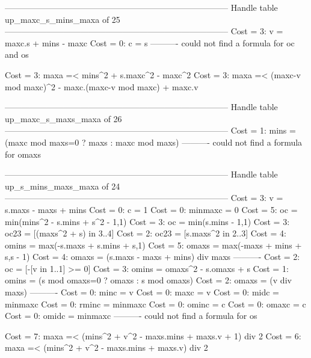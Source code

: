 --------------------------------------------------------------------------------
Handle table up_maxc_s_mins_maxa of 25
--------------------------------------------------------------------------------
Cost =  3:  v  = maxc.s + mins - maxc
Cost =  0:  c  = s
----------
could not find a formula for oc and os

Cost =  3:  maxa =< mins^2 + s.maxc^2 - maxc^2
Cost =  3:  maxa =< (maxc-v mod maxc)^2 - maxc.(maxc-v mod maxc) + maxc.v

--------------------------------------------------------------------------------
Handle table up_maxc_s_maxs_maxa of 26
--------------------------------------------------------------------------------
Cost =  1:  mins  = (maxc mod maxs=0 ? maxs : maxc mod maxs)
----------
could not find a formula for omaxs


--------------------------------------------------------------------------------
Handle table up_s_mins_maxs_maxa of 24
--------------------------------------------------------------------------------
Cost =  3:  v       = s.maxs - maxs + mins
Cost =  0:  c       = 1
Cost =  0:  minmaxc = 0
Cost =  5:  oc      = min(mins^2 - s.mins + s^2 - 1,1)
Cost =  3:  oc      = min(s.mins - 1,1)
Cost =  3:  oc23    = [(maxs^2 + s) in 3..4]
Cost =  2:  oc23    = [s.maxs^2 in 2..3]
Cost =  4:  omins   = max(-s.maxs + s.mins + s,1)
Cost =  5:  omaxs   = max(-maxs + mins + s,s - 1)
Cost =  4:  omaxs   = (s.maxs - maxs + mins) div maxs
----------
Cost =  2:  oc      = [-[v in 1..1] >= 0]
Cost =  3:  omins   = omaxs^2 - s.omaxs + s
Cost =  1:  omins   = (s mod omaxs=0 ? omaxs : s mod omaxs)
Cost =  2:  omaxs   = (v div maxs)
----------
Cost =  0:  minc    = v
Cost =  0:  maxc    = v
Cost =  0:  midc    = minmaxc
Cost =  0:  rminc   = minmaxc
Cost =  0:  ominc   = c
Cost =  0:  omaxc   = c
Cost =  0:  omidc   = minmaxc
----------
could not find a formula for os

Cost =  7:  maxa =< (mins^2 + v^2 - maxs.mins + maxs.v + 1) div 2
Cost =  6:  maxa =< (mins^2 + v^2 - maxs.mins + maxs.v) div 2
